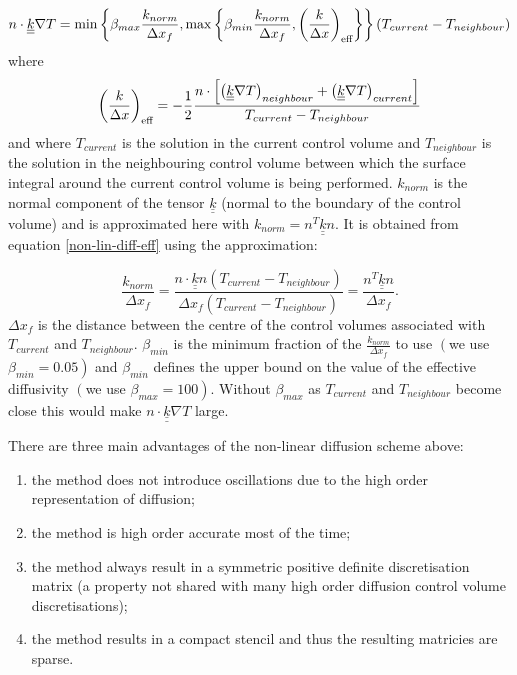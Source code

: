 \begin{equation}
n\cdot {\underline{\underline k}} \nabla T = 
\min\left\{ \beta_{max}\displaystyle\frac{k_{norm}}{{\Delta x}_{f}} , \max\left\{ \beta_{min}\displaystyle\frac{k_{norm}}{{\Delta x}_{f}} , \left( \displaystyle\frac{k}{\Delta x} \right)_{\text{eff}} \right\} \right\}\left(T_{current}-T_{neighbour}\right)
\label{non-lin-diff}
\end{equation}
where 
\begin{equation}
\left( \displaystyle\frac{k}{\Delta x} \right)_{\text{eff}} =  
- \displaystyle\frac{1}{2} \displaystyle\frac{ n\cdot \left[ \left({\underline{\underline k}} \nabla T\right)_{neighbour} + \left({\underline{\underline k}} \nabla T\right)_{current} \right] }{T_{current}-T_{neighbour}} 
\label{non-lin-diff-eff} 
\end{equation}
and where $T_{current}$ is the solution in the current control volume and $T_{neighbour}$ is the solution in the neighbouring control volume between which the surface integral around the current control volume is being performed. $k_{norm}$ is the normal component of the tensor ${\underline{\underline k}}$ (normal to the boundary of the control volume) and is approximated here with $k_{norm} =n^T {\underline{\underline k}} n $.  It is obtained from equation 
\ref{non-lin-diff-eff} using the approximation:

\begin{equation}
\frac{k_{norm}}{{\Delta x}_f}=  
 \frac{ n\cdot {\underline{\underline k}} n (T_{current}-T_{neighbour})}{{\Delta x}_f(T_{current}-T_{neighbour})}
= \frac{n^T {\underline{\underline k}} n}{{\Delta x}_f}. 
\label{non-lin-diff-eff-approx} 
\end{equation}
${\Delta x}_f$ is the distance between the centre of the control volumes associated with $T_{current}$ and $T_{neighbour}$.  $\beta_{min}$ is the minimum fraction of the $\frac{k_{norm}}{{\Delta x}_{f}}$ to use $\left(\right.$we use $\beta_{min}=0.05\left.\right)$ and $\beta_{min}$ defines the upper bound on the value of the effective diffusivity $\left(\right.$we use $\beta_{max}=100\left.\right)$.  Without $\beta_{max}$ as $T_{current}$ and $T_{neighbour}$ become close this would make  $n\cdot {\underline{\underline k}} \nabla T$ large. 

There are three main advantages of the non-linear diffusion scheme above: 
\begin{enumerate}[1)]
\item the method does not introduce oscillations due to the high order representation of diffusion; 
\item the method is high order accurate most of the time; 
\item the method always result in a symmetric positive definite discretisation matrix (a property not shared with many high order diffusion control volume discretisations); 
\item the method results in a compact stencil and thus the resulting matricies are sparse. 
\end{enumerate}

